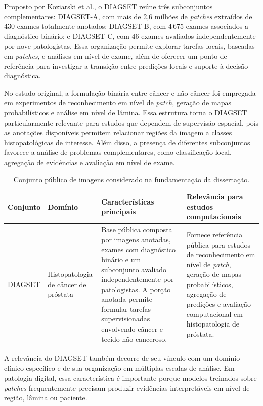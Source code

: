 Proposto por Koziarski et al., o DIAGSET reúne três subconjuntos complementares: DIAGSET-A, com mais de 2{,}6 milhões de \textit{patches} extraídos de 430 exames totalmente anotados; DIAGSET-B, com 4\,675 exames associados a diagnóstico binário; e DIAGSET-C, com 46 exames avaliados independentemente por nove patologistas. Essa organização permite explorar tarefas locais, baseadas em \textit{patches}, e análises em nível de exame, além de oferecer um ponto de referência para investigar a transição entre predições locais e suporte à decisão diagnóstica. 

No estudo original, a formulação binária entre câncer e não câncer foi empregada em experimentos de reconhecimento em nível de \textit{patch}, geração de mapas probabilísticos e análise em nível de lâmina. Essa estrutura torna o DIAGSET particularmente relevante para estudos que dependem de supervisão espacial, pois as anotações disponíveis permitem relacionar regiões da imagem a classes histopatológicas de interesse. Além disso, a presença de diferentes subconjuntos favorece a análise de problemas complementares, como classificação local, agregação de evidências e avaliação em nível de exame.

\begin{table}[!htb] \centering \caption{Conjunto público de imagens considerado na fundamentação da dissertação.} \label{tab:dataset_diagset} \begin{tabular}{p{2.7cm}p{3.4cm}p{5.2cm}p{4.0cm}} \toprule Conjunto & Domínio & Características principais & Relevância para estudos computacionais \\ \midrule DIAGSET & Histopatologia de câncer de próstata & Base pública composta por imagens anotadas, exames com diagnóstico binário e um subconjunto avaliado independentemente por patologistas. A porção anotada permite formular tarefas supervisionadas envolvendo câncer e tecido não canceroso. & Fornece referência pública para estudos de reconhecimento em nível de \textit{patch}, geração de mapas probabilísticos, agregação de predições e avaliação computacional em histopatologia de próstata. \\ \bottomrule \end{tabular} \end{table}

A relevância do DIAGSET também decorre de seu vínculo com um domínio clínico específico e de sua organização em múltiplas escalas de análise. Em patologia digital, essa característica é importante porque modelos treinados sobre \textit{patches} frequentemente precisam produzir evidências interpretáveis em nível de região, lâmina ou paciente. 

